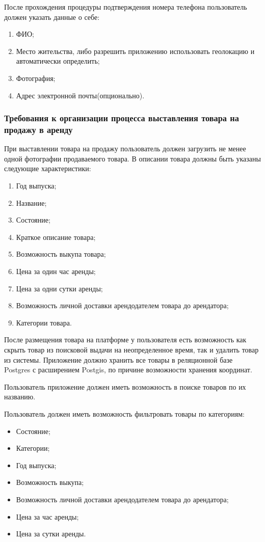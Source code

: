 После прохождения процедуры подтверждения номера телефона пользователь должен указать данные о себе:
\begin{enumerate}
    \item ФИО;
    \item Место жительства, либо разрешить приложению использовать геолокацию и автоматически определить;
    \item Фотография;
    \item Адрес электронной почты(опционально).
\end{enumerate}

\subsubsection{Требования к организации процесса выставления товара на продажу в аренду}\hfill

При выставлении товара на продажу пользователь должен загрузить не менее одной фотографии продаваемого товара.
В описании товара должны быть указаны следующие характеристики:
\begin{enumerate}
    \item Год выпуска;
    \item Название;
    \item Состояние;
    \item Краткое описание товара;
    \item Возможность выкупа товара;
    \item Цена за один час аренды;
    \item Цена за одни сутки аренды;
    \item Возможность личной доставки арендодателем товара до арендатора;
    \item Категории товара.
\end{enumerate}

После размещения товара на платформе у пользователя есть возможность как скрыть товар из поисковой выдачи на неопределенное время, так и удалить товар из системы.
Приложение должно хранить все товары в реляционной базе Postgres с расширением Postgis, по причине возможности хранения координат.


Пользователь приложение должен иметь возможность в поиске товаров по их названию.

Пользователь должен иметь возможность фильтровать товары по категориям:
\begin{itemize}
    \item Состояние;
    \item Категории;
    \item Год выпуска;
    \item Возможность выкупа;
    \item Возможность личной доставки арендодателем товара до арендатора;
    \item Цена за час аренды;
    \item Цена за сутки аренды.
\end{itemize}


